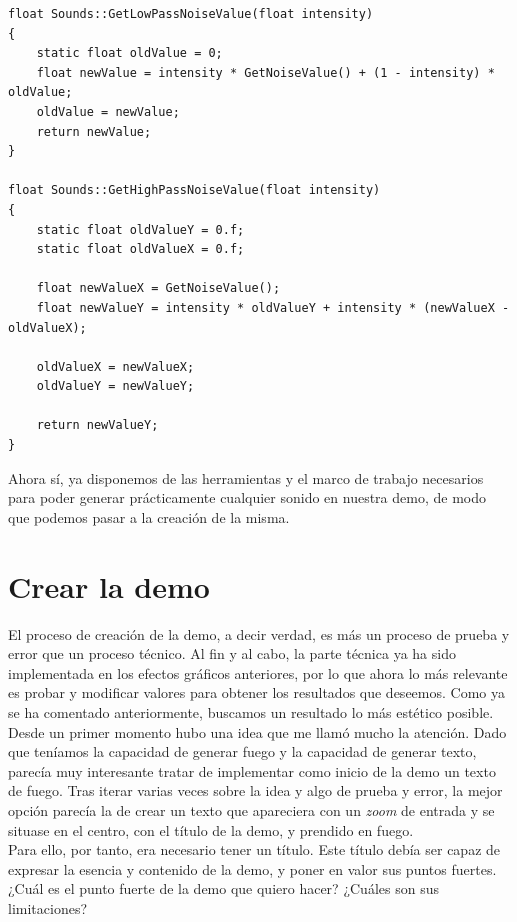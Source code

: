 \begin{lstlisting}[style=C-color, caption={Aplicación de un filtro de pasa baja y uno de pasa alta a la generación de ruido},label=cod:lowhighpass, escapechar=|]
float Sounds::GetLowPassNoiseValue(float intensity)
{
    static float oldValue = 0;
    float newValue = intensity * GetNoiseValue() + (1 - intensity) * oldValue;
    oldValue = newValue;
    return newValue;
}

float Sounds::GetHighPassNoiseValue(float intensity)
{
    static float oldValueY = 0.f;
    static float oldValueX = 0.f;
    
    float newValueX = GetNoiseValue();
    float newValueY = intensity * oldValueY + intensity * (newValueX - oldValueX);

    oldValueX = newValueX;
    oldValueY = newValueY;

    return newValueY;
}
\end{lstlisting}

Ahora sí, ya disponemos de las herramientas y el marco de trabajo necesarios para poder generar prácticamente cualquier sonido en nuestra demo, de modo que podemos pasar a la creación de la misma.

\section{Crear la demo}

El proceso de creación de la demo, a decir verdad, es más un proceso de prueba y error que un proceso técnico. Al fin y al cabo, la parte técnica ya ha sido implementada en los efectos gráficos anteriores, por lo que ahora lo más relevante es probar y modificar valores para obtener los resultados que deseemos. Como ya se ha comentado anteriormente, buscamos un resultado lo más estético posible.\\

Desde un primer momento hubo una idea que me llamó mucho la atención. Dado que teníamos la capacidad de generar fuego y la capacidad de generar texto, parecía muy interesante tratar de implementar como inicio de la demo un texto de fuego. Tras iterar varias veces sobre la idea y algo de prueba y error, la mejor opción parecía la de crear un texto que apareciera con un \emph{zoom} de entrada y se situase en el centro, con el título de la demo, y prendido en fuego.\\

Para ello, por tanto, era necesario tener un título. Este título debía ser capaz de expresar la esencia y contenido de la demo, y poner en valor sus puntos fuertes. ¿Cuál es el punto fuerte de la demo que quiero hacer? ¿Cuáles son sus limitaciones?\\

